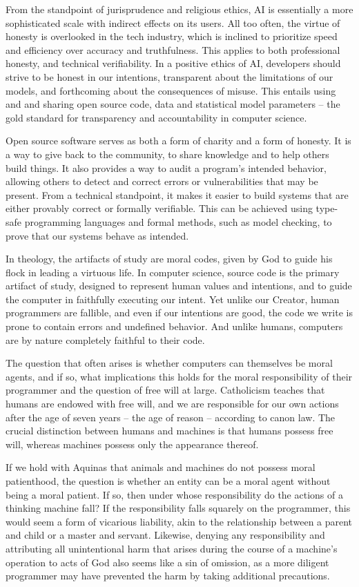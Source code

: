 \documentclass[sigplan,nonacm]{acmart}\settopmatter{printfolios=false,printccs=false,printacmref=false}
\begin{document}
  From the standpoint of jurisprudence and religious ethics, AI is essentially a more sophisticated scale with indirect effects on its users. All too often, the virtue of honesty is overlooked in the tech industry, which is inclined to prioritize speed and efficiency over accuracy and truthfulness. This applies to both professional honesty, and technical verifiability. In a positive ethics of AI, developers should strive to be honest in our intentions, transparent about the limitations of our models, and forthcoming about the consequences of misuse. This entails using and and sharing open source code, data and statistical model parameters -- the gold standard for transparency and accountability in computer science.

  Open source software serves as both a form of charity and a form of honesty. It is a way to give back to the community, to share knowledge and to help others build things. It also provides a way to audit a program's intended behavior, allowing others to detect and correct errors or vulnerabilities that may be present. From a technical standpoint, it makes it easier to build systems that are either provably correct or formally verifiable. This can be achieved using type-safe programming languages and formal methods, such as model checking, to prove that our systems behave as intended.

  In theology, the artifacts of study are moral codes, given by God to guide his flock in leading a virtuous life. In computer science, source code is the primary artifact of study, designed to represent human values and intentions, and to guide the computer in faithfully executing our intent. Yet unlike our Creator, human programmers are fallible, and even if our intentions are good, the code we write is prone to contain errors and undefined behavior. And unlike humans, computers are by nature completely faithful to their code.

  The question that often arises is whether computers can themselves be moral agents, and if so, what implications this holds for the moral responsibility of their programmer and the question of free will at large. Catholicism teaches that humans are endowed with free will, and we are responsible for our own actions after the age of seven years -- the age of reason -- according to canon law. The crucial distinction between humans and machines is that humans possess free will, whereas machines possess only the appearance thereof.

  If we hold with Aquinas that animals and machines do not possess moral patienthood, the question is whether an entity can be a moral agent without being a moral patient. If so, then under whose responsibility do the actions of a thinking machine fall? If the responsibility falls squarely on the programmer, this would seem a form of vicarious liability, akin to the relationship between a parent and child or a master and servant. Likewise, denying any responsibility and attributing all unintentional harm that arises during the course of a machine's operation to acts of God also seems like a sin of omission, as a more diligent programmer may have prevented the harm by taking additional precautions.
\end{document}

